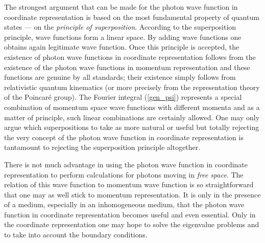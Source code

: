 \documentclass[11pt]{article}
\begin{document}
The strongest argument that can be made for the photon wave function in
coordinate representation is based on the most fundamental property of
quantum states --- on the {\em principle of superposition}. According to the
superposition principle, wave functions form a linear space. By adding wave
functions one obtains again legitimate wave function. Once this principle is
accepted, the existence of photon wave functions in coordinate
representation follows from the existence of the photon wave functions in
momentum representation and these functions are genuine by all standards;
their existence simply follows from relativistic quantum kinematics (or more
precisely from the representation theory of the Poincar\'e group). The
Fourier integral (\ref{gen_psi}) represents a special combination of
momentum space wave functions with different momenta and as a matter of
principle, such linear combinations are certainly allowed. One may only
argue which superpositions to take as more natural or useful but totally
rejecting the very concept of the photon wave function in coordinate
representation is tantamount to rejecting the superposition principle
altogether.

There is not much advantage in using the photon wave function in coordinate
representation to perform calculations for photons moving in {\em free space}. The relation of this wave function to momentum wave function is so
straightforward that one may as well stick to momentum representation. It is
only in the presence of a medium, especially in an inhomogeneous medium,
that the photon wave function in coordinate representation becomes useful and even essential. Only in the coordinate representation one may hope to solve the eigenvalue problems and to take into account the boundary conditions.
\end{document}
